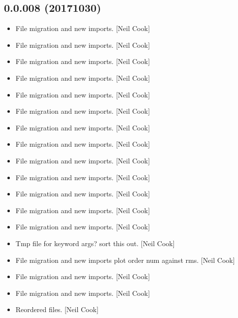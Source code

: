 \documentclass[a4paper,10pt,english]{report}
\begin{document}
\subsection{0.0.008 (2017\sphinxhyphen{}10\sphinxhyphen{}30)}
\label{\detokenize{misc/changelog:id562}}\begin{itemize}
\item {} 
File migration and new imports. {[}Neil Cook{]}

\item {} 
File migration and new imports. {[}Neil Cook{]}

\item {} 
File migration and new imports. {[}Neil Cook{]}

\item {} 
File migration and new imports. {[}Neil Cook{]}

\item {} 
File migration and new imports. {[}Neil Cook{]}

\item {} 
File migration and new imports. {[}Neil Cook{]}

\item {} 
File migration and new imports. {[}Neil Cook{]}

\item {} 
File migration and new imports. {[}Neil Cook{]}

\item {} 
File migration and new imports. {[}Neil Cook{]}

\item {} 
File migration and new imports. {[}Neil Cook{]}

\item {} 
File migration and new imports. {[}Neil Cook{]}

\item {} 
File migration and new imports. {[}Neil Cook{]}

\item {} 
File migration and new imports. {[}Neil Cook{]}

\item {} 
Tmp file for keyword args? \sphinxhyphen{} sort this out. {[}Neil Cook{]}

\item {} 
File migration and new imports plot order num against rms. {[}Neil Cook{]}

\item {} 
File migration and new imports. {[}Neil Cook{]}

\item {} 
File migration and new imports. {[}Neil Cook{]}

\item {} 
Reordered files. {[}Neil Cook{]}

\end{itemize}
\end{document}
